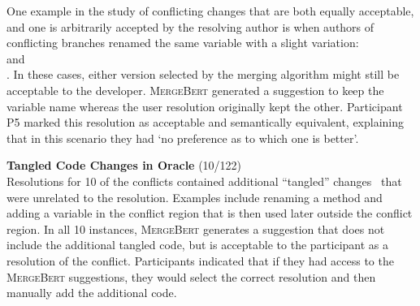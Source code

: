       One example in the study of conflicting changes that are both equally acceptable, and one is arbitrarily accepted by the resolving author is when authors of conflicting branches renamed the same variable with a slight variation:\\  and \\ . In these cases, either version selected by the merging algorithm might still be acceptable to the developer. \textsc{MergeBert} generated a suggestion to keep the variable name  whereas the user resolution originally kept the other. Participant P5 marked this resolution as acceptable and semantically equivalent, explaining that in this scenario they had `no preference as to which one is better'.

\noindent{}\textbf{Tangled Code Changes in Oracle} (10/122) \\
Resolutions for 10 of the conflicts contained additional ``tangled'' changes~\cite{Herzig:msr13:ImpactOfTangledCodeChanges,Kirinuki:icpc14:TangledChanges} that were unrelated to the resolution. Examples include renaming a method and adding a variable in the conflict region that is then used later outside the conflict region.
In all 10 instances, \textsc{MergeBert} generates a suggestion that does not include the additional tangled code, but is acceptable to the participant as a resolution of the conflict. 
Participants indicated that if they had access to the \textsc{MergeBert} suggestions, they would select the correct resolution and then manually add the additional code. 





